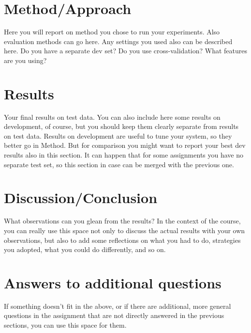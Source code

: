 \documentclass[11pt]{article}
\begin{document}
\section{Method/Approach}

Here you will report on method you chose to run your experiments. Also evaluation methods can go here.
Any settings you used also can be described here. Do you have a separate dev set? Do you use cross-validation? What features are you using?

\section{Results}

Your final results on test data. You can also include here some results on development, of course, but you should keep them clearly separate from results on test data. Results on development are useful to tune your system, so they better go in Method. But for comparison you might want to report your best dev results also in this section. It can happen that for some assignments you have no separate test set, so this section in case can be merged with the previous one.

\section{Discussion/Conclusion}

What observations can you glean from the results? In the context of the course, you can really use this space not only to discuss the actual results with your own observations, but also to add some reflections on what you had to do, strategies you adopted, what you could do differently, and so on.

\section{Answers to additional questions}

If something doesn't fit in the above, or if there are additional, more general questions in the assignment that are not directly answered in the previous sections, you can use this space for them.




\end{document}
